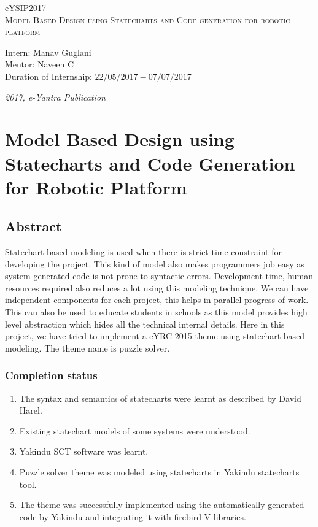 \documentclass[a4paper,12pt,oneside]{book}
\begin{document}
\begin{titlepage}
\raggedright
{\Large eYSIP2017\\[1cm]}
{\Huge\scshape Model Based Design using Statecharts and Code generation for robotic platform \\[.1in]}
\vfill
\begin{flushright}
{\large Intern: Manav Guglani \\}
{\large Mentor: Naveen C \\}
{\large Duration of Internship: $ 22/05/2017-07/07/2017 $ \\}
\end{flushright}

{\itshape 2017, e-Yantra Publication}
\end{titlepage}

\chapter[Project Tag]{ Model Based Design using Statecharts and Code Generation for Robotic Platform}
\section*{Abstract}
Statechart based modeling is used when there is strict time constraint for developing the project. This kind of model also makes programmers job easy as system generated code is not prone to syntactic errors. Development time, human
resources required also reduces a lot using this modeling technique. We can have
independent components for each project, this helps in parallel progress of work.
This can also be used to educate students in schools as this model provides high
level abstraction which hides all the technical internal details. Here in this project, we have tried to implement a eYRC 2015 theme using statechart based modeling. The theme name is puzzle solver.
\subsection*{Completion status}
\begin{enumerate}
\item The syntax and semantics of statecharts were learnt as described by David Harel. 
\item Existing statechart models of some systems were understood. 
\item Yakindu SCT software was learnt. 
\item Puzzle solver theme was modeled using statecharts in Yakindu statecharts tool.
\item The theme was successfully implemented using the automatically generated code by Yakindu and integrating it with firebird V libraries. 
\end{enumerate}
\end{document}
